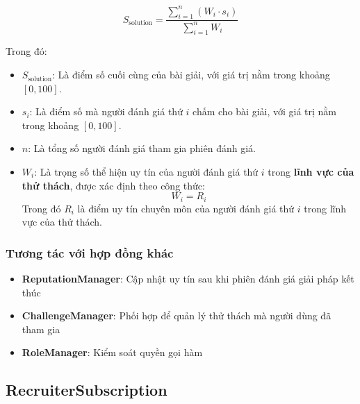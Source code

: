 \[
S_{\text{solution}}= \frac{\displaystyle\sum_{i=1}^{n} (W_{i} \cdot s_{i})}{\displaystyle\sum_{i=1}^{n} W_{i}}
\]

Trong đó:

\begin{itemize}
  \item $S_{\text{solution}}$: Là điểm số cuối cùng của bài giải, với giá trị nằm trong khoảng $[0, 100]$.
  \item $s_{i}$: Là điểm số mà người đánh giá thứ $i$ chấm cho bài giải, với giá trị nằm trong khoảng $[0, 100]$.
  \item $n$: Là tổng số người đánh giá tham gia phiên đánh giá.
  \item $W_{i}$: Là trọng số thể hiện uy tín của người đánh giá thứ $i$ trong \textbf{lĩnh vực của thử thách}, được xác định theo công thức:
  \[
  W_{i} = R_{i}
  \]
  Trong đó $R_{i}$ là điểm uy tín chuyên môn của người đánh giá thứ $i$ trong lĩnh vực của thử thách.
\end{itemize}



\subsubsection{Tương tác với hợp đồng khác}

\begin{itemize}
  \item \textbf{ReputationManager}: Cập nhật uy tín sau khi phiên đánh giá giải pháp kết thúc
  \item \textbf{ChallengeManager}: Phối hợp để quản lý thử thách mà người dùng đã tham gia
  \item \textbf{RoleManager}: Kiểm soát quyền gọi hàm
\end{itemize}

\subsection{RecruiterSubscription}